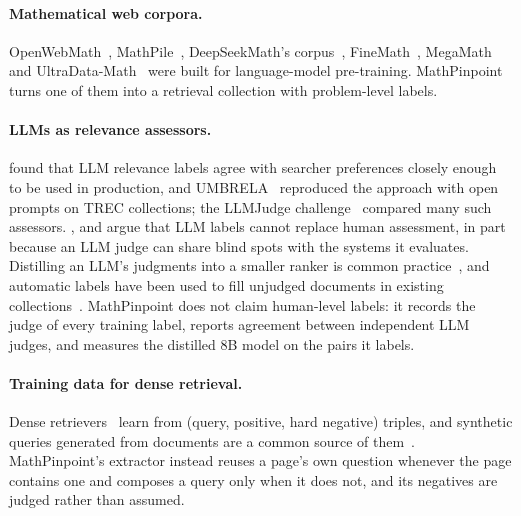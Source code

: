 \paragraph{Mathematical web corpora.}
OpenWebMath~\citep{paster2024openwebmath}, MathPile~\citep{wang2024mathpile}, DeepSeekMath's corpus~\citep{shao2024deepseekmath}, FineMath~\citep{allal2025smollm2}, MegaMath~\citep{zhou2025megamath} and UltraData-Math~\citep{ultradata-math,wang2026tiered} were built for language-model pre-training. MathPinpoint turns one of them into a retrieval collection with problem-level labels.

\paragraph{LLMs as relevance assessors.}
\citet{thomas2024preferences} found that LLM relevance labels agree with searcher preferences closely enough to be used in production, and UMBRELA~\citep{upadhyay2024umbrela,upadhyay2025umbrelastudy} reproduced the approach with open prompts on TREC collections; the LLMJudge challenge~\citep{rahmani2024llmjudge} compared many such assessors. \citet{faggioli2023perspectives}, \citet{clarke2025cantreplace} and \citet{soboroff2025dont} argue that LLM labels cannot replace human assessment, in part because an LLM judge can share blind spots with the systems it evaluates. Distilling an LLM's judgments into a smaller ranker is common practice~\citep{sun2023rankgpt}, and automatic labels have been used to fill unjudged documents in existing collections~\citep{macavaney2023oneshot}. MathPinpoint does not claim human-level labels: it records the judge of every training label, reports agreement between independent LLM judges, and measures the distilled 8B model on the pairs it labels.

\paragraph{Training data for dense retrieval.}
Dense retrievers~\citep{karpukhin2020dpr,xiong2021ance,reimers2019sbert} learn from (query, positive, hard negative) triples, and synthetic queries generated from documents are a common source of them~\citep{bonifacio2022inpars,dai2023promptagator}. MathPinpoint's extractor instead reuses a page's own question whenever the page contains one and composes a query only when it does not, and its negatives are judged rather than assumed.

